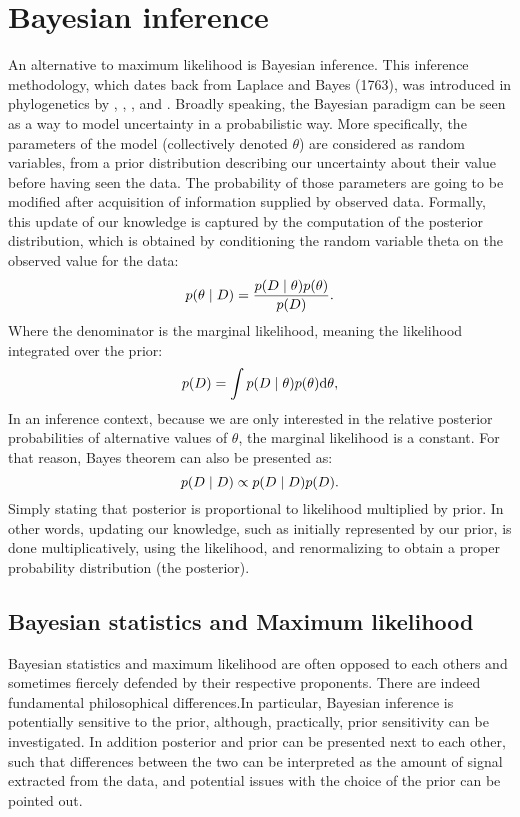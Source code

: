 \section{Bayesian inference}
\label{sec:intro-bayesian}

An alternative to maximum likelihood is Bayesian inference.
This inference methodology, which dates back from Laplace and Bayes (1763), was introduced in phylogenetics by \citet{Yang1997}, \citet{Mau1999}, \citet{Larget1999}, \citet{Li2000} and \citet{Huelsenbeck2001}.
Broadly speaking, the Bayesian paradigm can be seen as a way to model uncertainty in a probabilistic way.
More specifically, the parameters of the model (collectively denoted $\theta$) are considered as random variables, from a prior distribution describing our uncertainty about their value before having seen the data.
The probability of those parameters are going to be modified after acquisition of information supplied by observed data.
Formally, this update of our knowledge is captured by the computation of the posterior distribution, which is obtained by conditioning the random variable theta on the observed value for the data:
\begin{equation}
    p(\theta \mid D)=\frac{p(D \mid \theta)p(\theta)}{p(D)}.
\end{equation}
Where the denominator is the marginal likelihood, meaning the likelihood integrated over the prior:
\begin{equation}
    p(D) = \int p(D \mid \theta) p(\theta) \mathrm{d} \theta,
\end{equation}
In an inference context, because we are only interested in the relative posterior probabilities of alternative values of $\theta$, the marginal likelihood is a constant.
For that reason, Bayes theorem can also be presented as:
\begin{equation}
    p(D \mid D) \propto p(D \mid D)p(D).
\end{equation}
Simply stating that \gls{posterior} is proportional to \gls{likelihood} multiplied by \gls{prior}.
In other words, updating our knowledge, such as initially represented by our prior, is done multiplicatively, using the likelihood, and renormalizing to obtain a proper probability distribution (the posterior).

\subsection{Bayesian statistics and {Maximum likelihood}}
Bayesian statistics and maximum \gls{likelihood} are often opposed to each others and sometimes fiercely defended by their respective proponents.
There are indeed fundamental philosophical differences.In particular, Bayesian inference is potentially sensitive to the prior, although, practically, prior sensitivity can be investigated.
In addition posterior and prior can be presented next to each other, such that differences between the two can be interpreted as the amount of signal extracted from the data, and potential issues with the choice of the prior can be pointed out.

